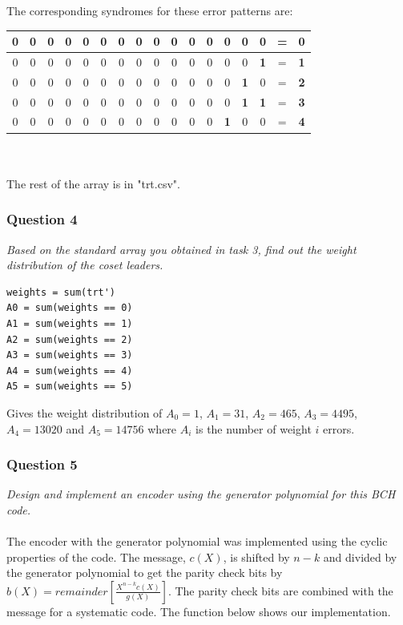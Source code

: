 \documentclass[a4paper]{article}
\begin{document}
The corresponding syndromes for these error patterns are:\\
\begin{tabular}{| *{15}{c} | c c |}
\hline
0 & 0 & 0 & 0 & 0 & 0 & 0 & 0 & 0 & 0 & 0 & 0 & 0 & 0 & 0 & = & \textbf{0}  \\
\hline
0 & 0 & 0 & 0 & 0 & 0 & 0 & 0 & 0 & 0 & 0 & 0 & 0 & 0 & \textbf{1} & = & \textbf{1}  \\
\hline
0 & 0 & 0 & 0 & 0 & 0 & 0 & 0 & 0 & 0 & 0 & 0 & 0 & \textbf{1} & 0 & = & \textbf{2}  \\
\hline
0 & 0 & 0 & 0 & 0 & 0 & 0 & 0 & 0 & 0 & 0 & 0 & 0 & \textbf{1} & \textbf{1} & = & \textbf{3}  \\
\hline
0 & 0 & 0 & 0 & 0 & 0 & 0 & 0 & 0 & 0 & 0 & 0 & \textbf{1} & 0 & 0 & = & \textbf{4}  \\
\hline
\end{tabular}\\
\\
The rest of the array is in "trt.csv".

\subsubsection{Question 4} \textit{Based on the standard array you obtained in task 3, find out the weight distribution of the coset leaders.}
\begin{lstlisting}
weights = sum(trt')
A0 = sum(weights == 0)
A1 = sum(weights == 1)
A2 = sum(weights == 2)
A3 = sum(weights == 3)
A4 = sum(weights == 4)
A5 = sum(weights == 5)
\end{lstlisting}
Gives the weight distribution of $A_0 = 1$, $A_1 = 31$, $A_2 = 465$, $A_3 = 4495$, $A_4 = 13020$ and $A_5 = 14756$ where $A_i$ is the number of weight $i$ errors.

\subsubsection{Question 5} \textit{Design and implement an encoder using the generator polynomial for this BCH code.} \\
\\
The encoder with the generator polynomial was implemented using the cyclic properties of the code. The message, $c(X)$, is shifted by $n-k$ and divided by the generator polynomial to get the parity check bits by $b(X) = remainder[\frac{X^{n-k}c(X)}{g(X)}]$. The parity check bits are combined with the message for a systematic code. The function below shows our implementation.
\end{document}
